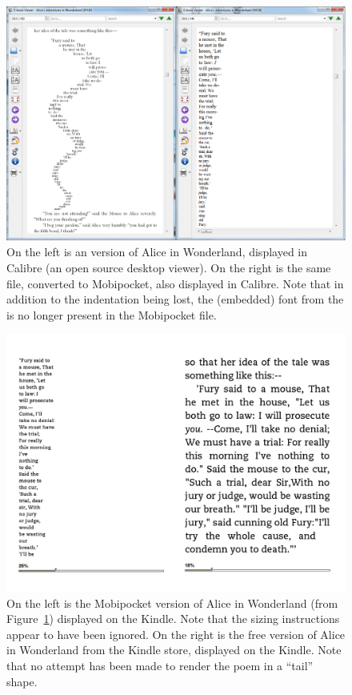 \begin{figure}[p]
\includegraphics[width=\textwidth]{gfx/alices1}
\caption[Document displayed in Calibre]{On the left is an \epub{} version of Alice in Wonderland, displayed in Calibre (an open source desktop \ebook{} viewer). On the right is the same file, converted to Mobipocket, also displayed in Calibre. Note that in addition to the indentation being lost, the (embedded) font from the \epub{} is no longer present in the Mobipocket file.}
\label{fig:alices1}
\end{figure}

\begin{figure}[p]
\includegraphics[width=\textwidth]{gfx/alices2}
\caption[The same document displayed on the Kindle]{On the left is the Mobipocket version of Alice in Wonderland (from Figure~\ref{fig:alices1}) displayed on the Kindle. Note that the sizing instructions appear to have been ignored. On the right is the free version of Alice in Wonderland from the Kindle store, displayed on the Kindle. Note that no attempt has been made to render the poem in a ``tail'' shape.}
\label{fig:alices2}
\end{figure}

